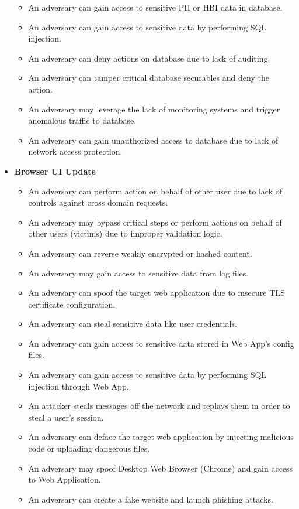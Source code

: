 \begin{itemize}
\begin{itemize}
        \item An adversary can gain access to sensitive PII or HBI data in database.
        \item An adversary can gain access to sensitive data by performing SQL injection.
        \item An adversary can deny actions on database due to lack of auditing.
        \item An adversary can tamper critical database securables and deny the action.
        \item An adversary may leverage the lack of monitoring systems and trigger anomalous traffic to database.
        \item An adversary can gain unauthorized access to database due to lack of network access protection.
    \end{itemize}
    \item \textbf{Browser UI Update}
    \begin{itemize}
        \item An adversary can perform action on behalf of other user due to lack of controls against cross domain requests.
        \item An adversary may bypass critical steps or perform actions on behalf of other users (victims) due to improper validation logic.
        \item An adversary can reverse weakly encrypted or hashed content.
        \item An adversary may gain access to sensitive data from log files.
        \item An adversary can spoof the target web application due to insecure TLS certificate configuration.
        \item An adversary can steal sensitive data like user credentials.
        \item An adversary can gain access to sensitive data stored in Web App's config files.
        \item An adversary can gain access to sensitive data by performing SQL injection through Web App.
        \item An attacker steals messages off the network and replays them in order to steal a user's session.
        \item An adversary can deface the target web application by injecting malicious code or uploading dangerous files.
        \item An adversary may spoof Desktop Web Browser (Chrome) and gain access to Web Application.
        \item An adversary can create a fake website and launch phishing attacks.

\end{itemize}
\end{itemize}
